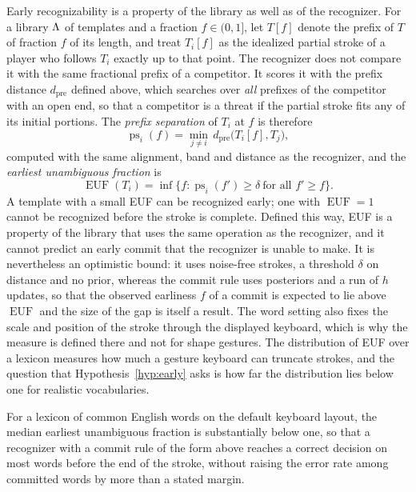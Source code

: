 Early recognizability is a property of the library as well as of the recognizer. For a library $\Lambda$ of templates and a fraction $f\in(0,1]$, let $T[f]$ denote the prefix of $T$ of fraction $f$ of its length, and treat $T_i[f]$ as the idealized partial stroke of a player who follows $T_i$ exactly up to that point. The recognizer does not compare it with the same fractional prefix of a competitor. It scores it with the prefix distance $d_{\mathrm{pre}}$ defined above, which searches over \emph{all} prefixes of the competitor with an open end, so that a competitor is a threat if the partial stroke fits any of its initial portions. The \emph{prefix separation} of $T_i$ at $f$ is therefore
\[
\operatorname{ps}_i(f)=\min_{j\ne i}\,d_{\mathrm{pre}}\bigl(T_i[f],T_j\bigr),
\]
computed with the same alignment, band and distance as the recognizer, and the \emph{earliest unambiguous fraction} is
\[
\operatorname{EUF}(T_i)=\inf\{f:\operatorname{ps}_i(f')\ge\delta\ \text{for all } f'\ge f\}.
\]
A template with a small EUF can be recognized early; one with $\operatorname{EUF}=1$ cannot be recognized before the stroke is complete. Defined this way, EUF is a property of the library that uses the same operation as the recognizer, and it cannot predict an early commit that the recognizer is unable to make. It is nevertheless an optimistic bound: it uses noise-free strokes, a threshold $\delta$ on distance and no prior, whereas the commit rule uses posteriors and a run of $h$ updates, so that the observed earliness $f$ of a commit is expected to lie above $\operatorname{EUF}$ and the size of the gap is itself a result. The word setting also fixes the scale and position of the stroke through the displayed keyboard, which is why the measure is defined there and not for shape gestures. The distribution of EUF over a lexicon measures how much a gesture keyboard can truncate strokes, and the question that Hypothesis~\ref{hyp:early} asks is how far the distribution lies below one for realistic vocabularies.

\begin{hypothesis}\label{hyp:early}
For a lexicon of common English words on the default keyboard layout, the median earliest unambiguous fraction is substantially below one, so that a recognizer with a commit rule of the form above reaches a correct decision on most words before the end of the stroke, without raising the error rate among committed words by more than a stated margin.\evH
\end{hypothesis}

